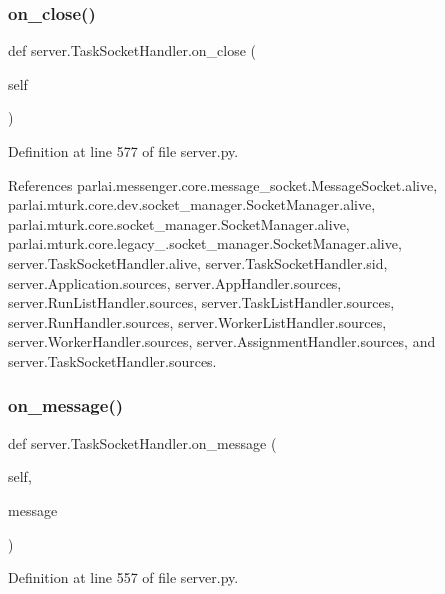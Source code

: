 \subsubsection{\texorpdfstring{on\+\_\+close()}{on\_close()}}
{\footnotesize\ttfamily def server.\+Task\+Socket\+Handler.\+on\+\_\+close (\begin{DoxyParamCaption}\item[{}]{self }\end{DoxyParamCaption})}



Definition at line 577 of file server.\+py.



References parlai.\+messenger.\+core.\+message\+\_\+socket.\+Message\+Socket.\+alive, parlai.\+mturk.\+core.\+dev.\+socket\+\_\+manager.\+Socket\+Manager.\+alive, parlai.\+mturk.\+core.\+socket\+\_\+manager.\+Socket\+Manager.\+alive, parlai.\+mturk.\+core.\+legacy\+\_.\+socket\+\_\+manager.\+Socket\+Manager.\+alive, server.\+Task\+Socket\+Handler.\+alive, server.\+Task\+Socket\+Handler.\+sid, server.\+Application.\+sources, server.\+App\+Handler.\+sources, server.\+Run\+List\+Handler.\+sources, server.\+Task\+List\+Handler.\+sources, server.\+Run\+Handler.\+sources, server.\+Worker\+List\+Handler.\+sources, server.\+Worker\+Handler.\+sources, server.\+Assignment\+Handler.\+sources, and server.\+Task\+Socket\+Handler.\+sources.

\mbox{\label{classserver_1_1TaskSocketHandler_ab117ce39dbeced9ce1092b3b3a56fe5c}} 
\subsubsection{\texorpdfstring{on\+\_\+message()}{on\_message()}}
{\footnotesize\ttfamily def server.\+Task\+Socket\+Handler.\+on\+\_\+message (\begin{DoxyParamCaption}\item[{}]{self,  }\item[{}]{message }\end{DoxyParamCaption})}



Definition at line 557 of file server.\+py.



